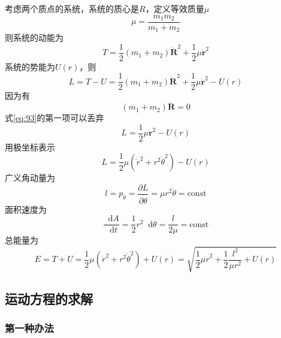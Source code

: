 \documentclass{article}
\newcommand*{\dif}{\mathop{}\!\mathrm{d}}
\begin{document}
考虑两个质点的系统，系统的质心是$R$，定义等效质量$\mu$
\begin{equation}
  \label{eq:91}
  \mu = \dfrac{m_{1} m_{2}}{m_{1} + m_{2}} 
\end{equation}
则系统的动能为
\begin{equation}
  \label{eq:92}
  T = \dfrac{1}{2} \left( m_{1} + m_{2} \right) \dot{\mathbf{R}}^{2} + \dfrac{1}{2} \mu \dot{\mathbf{r}}^{2}
\end{equation}
系统的势能为$U(r)$，则
\begin{equation}
  \label{eq:93}
  L = T - U =  \dfrac{1}{2} \left( m_{1} + m_{2} \right) \dot{\mathbf{R}}^{2} + \dfrac{1}{2} \mu \dot{\mathbf{r}}^{2} - U(r)
\end{equation}
因为有
\begin{equation}
  \label{eq:94}
  \left( m_{1} + m_{2} \right)\ddot{\mathbf{R}} = 0
\end{equation}
式\ref{eq:93}的第一项可以丢弃
\begin{equation}
  \label{eq:95}
  L = \dfrac{1}{2} \mu \dot{\mathbf{r}}^{2} - U(r)
\end{equation}
用极坐标表示
\begin{equation}
  \label{eq:96}
  L = \dfrac{1}{2} \mu \left( \dot{r}^{2} + r^{2} \dot{\theta}^{2} \right) - U(r)
\end{equation}
广义角动量为
\begin{equation}
  \label{eq:97}
  l = p_{\theta} = \dfrac{\partial L}{\partial \dot{\theta}} = \mu r^{2} \dot{\theta} = \mathrm{const} 
\end{equation}
面积速度为
\begin{equation}
  \label{eq:98}
  \dfrac{\dif A }{\dif t} = \dfrac{1}{2} r^{2} \dif \theta = \dfrac{l}{2\mu} = \mathrm{const}
\end{equation}
总能量为
\begin{equation}
  \label{eq:99}
  E = T + U = \dfrac{1}{2} \mu \left( \dot{r}^{2} + r^{2} \dot{\theta}^{2} \right) + U(r) = \sqrt{ \dfrac{1}{2} \mu \dot{r}^{2} + \dfrac{1}{2} \dfrac{l^{2}}{\mu r^{2}} + U(r) }
\end{equation}

\subsection{运动方程的求解}

\subsubsection{第一种办法}
\end{document}
